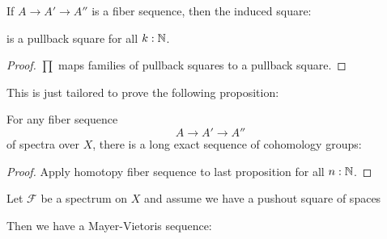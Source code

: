 \begin{lemma}
  If $A\to A'\to A''$ is a fiber sequence, then the induced square:
  \begin{center}
  \end{center}
  is a pullback square for all $k:\mathbb{N}$.
\end{lemma}
\begin{proof}
  $\prod$ maps families of pullback squares to a pullback square.
\end{proof}

This is just tailored to prove the following proposition:

\begin{proposition}
  For any fiber sequence
  \[ A\to A'\to A'' \]
  of spectra over $X$, there is a long exact sequence of cohomology groups:
  \begin{center}
  \end{center}
\end{proposition}

\begin{proof}
  Apply homotopy fiber sequence to last proposition for all $n:\mathbb{N}$.
\end{proof}

\begin{lemma}
  \label{mayer-vietoris-sequence}
  Let $\mathcal F$ be a spectrum on $X$ and assume we have a pushout square of spaces
  \begin{center}
  \end{center}
  Then we have a Mayer-Vietoris sequence:
  \begin{center}
  \end{center}
\end{lemma}
 
